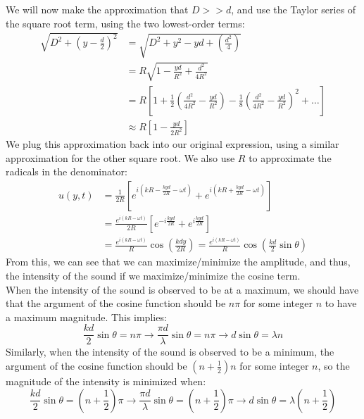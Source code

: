 We will now make the approximation that $D >> d$, and use the Taylor series of the square root term, using the two lowest-order terms: 
\begin{align*}
	\sqrt{D^2 + \left(y - \frac{d}{2} \right)^2} &= \sqrt{D^2 + y^2 - yd + \left( \frac{d^2}{4} \right)} \\
	&= R \sqrt{1 - \frac{yd}{R^2} + \frac{d^2}{4R^2}} \\
	&= R \left[1 + \frac{1}{2}\left(\frac{d^2}{4R^2} - \frac{yd}{R^2}\right) - \frac{1}{8}\left(\frac{d^2}{4R^2} - \frac{yd}{R^2}\right)^2 + \ldots \right] \\
	&\approx R\left[1 - \frac{yd}{2R^2} \right] 
\end{align*}
We plug this approximation back into our original expression, using a similar approximation for the other square root. We also use $R$ to approximate the radicals in the denominator: 
\begin{align*}
	u(y, t) &= \frac{1}{2R} \left[ e^{i \left(kR - \frac{kyd}{2R} - \omega t\right)} + e^{i \left(k R + \frac{kyd}{2R} - \omega t\right)} \right] \\
	&= \frac{e^{i \left(kR - \omega t\right)}}{2R} \left[ e^{- i\frac{kyd}{2R}} + e^{i\frac{kyd}{2R}} \right] \\
	&= \frac{e^{i \left(kR - \omega t\right)}}{R} \cos \left( \frac{kdy}{2R}\right) = \frac{e^{i \left(kR - \omega t\right)}}{R} \cos \left( \frac{kd}{2} \sin \theta \right)
\end{align*}
From this, we can see that we can maximize/minimize the amplitude, and thus, the intensity of the sound if we maximize/minimize the cosine term. \\
When the intensity of the sound is observed to be at a maximum, we should have that the argument of the cosine function should be $n \pi$ for some integer $n$ to have a maximum magnitude. This implies:
\[
	\frac{kd}{2}\sin \theta = n \pi  \rightarrow \frac{\pi d}{\lambda}\sin \theta = n \pi \rightarrow d\sin \theta = \lambda n 
\] 
Similarly, when the intensity of the sound is observed to be a minimum, the argument of the cosine function should be $\left( n + \frac{1}{2} \right) n$ for some integer $n$, so the magnitude of the intensity is minimized when:
\[
	\frac{kd}{2}\sin \theta = \left( n + \frac{1}{2} \right) \pi  \rightarrow \frac{\pi d}{\lambda}\sin \theta = \left( n + \frac{1}{2} \right) \pi \rightarrow d\sin \theta = \lambda \left( n + \frac{1}{2} \right) 
\]
